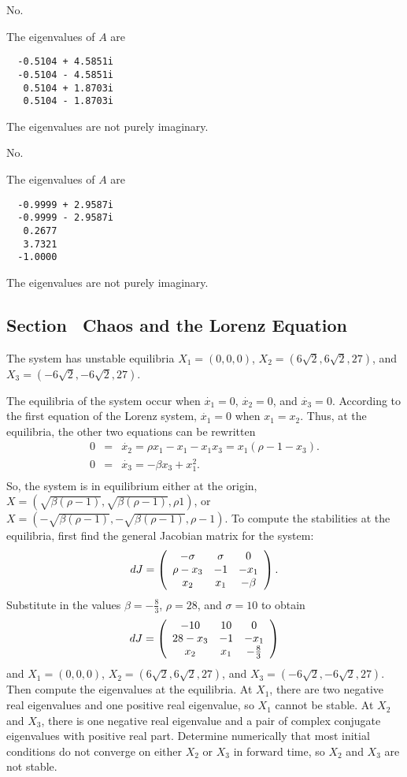  \ans No.

\soln The eigenvalues of $A$ are 
\begin{verbatim}
  -0.5104 + 4.5851i
  -0.5104 - 4.5851i
   0.5104 + 1.8703i
   0.5104 - 1.8703i
\end{verbatim}
The eigenvalues are not purely imaginary.

 \ans No.

\soln The eigenvalues of $A$ are 
\begin{verbatim}
  -0.9999 + 2.9587i
  -0.9999 - 2.9587i
   0.2677          
   3.7321          
  -1.0000          
\end{verbatim}
The eigenvalues are not purely imaginary.



\newpage
\subsection*{Section~\protect{\ref{S:chaos}} Chaos and the Lorenz Equation}

 \ans The system has unstable equilibria $X_1 = (0,0,0)$, 
$X_2 = (6\sqrt{2},6\sqrt{2},27)$, and $X_3 = (-6\sqrt{2},-6\sqrt{2},27)$.

\soln The equilibria of the system occur when $\dot{x_1} = 0$, $\dot{x_2}
= 0$, and $\dot{x_3} = 0$.  According to the first equation of the Lorenz
system, $\dot{x_1} = 0$ when $x_1 = x_2$.  Thus, at the equilibria, the
other two equations can be rewritten
\[
\begin{array}{rcl}
0 & = & \dot{x_2} = \rho x_1 - x_1 - x_1x_3 = x_1(\rho - 1 - x_3). \\
0 & = & \dot{x_3} = -\beta x_3 + x_1^2. \\
\end{array}
\]
So, the system is in equilibrium either at the origin, $X =
(\sqrt{\beta (\rho - 1)}, \sqrt{\beta (\rho - 1)}, \rho 1)$, or
$X = (-\sqrt{\beta (\rho - 1)}, -\sqrt{\beta (\rho - 1)}, \rho - 1)$.
To compute the stabilities at the equilibria, first find the general
Jacobian matrix for the system:
\[
dJ = \left(\begin{array}{ccc} -\sigma & \sigma & 0 \\ \rho - x_3 & -1 & -x_1 \\ x_2 & x_1 & -\beta\end{array}\right).
\]
Substitute in the values $\beta = -\frac{8}{3}$, $\rho = 28$, and $\sigma
= 10$ to obtain
\[
dJ = \left(\begin{array}{ccc} -10 & 10 & 0 \\ 28 - x_3 & -1 & -x_1 \\ x_2 & x_1 & -\frac{8}{3}\end{array}\right)
\]
and $X_1 = (0,0,0)$, $X_2 = (6\sqrt{2},6\sqrt{2},27)$, and
$X_3 = (-6\sqrt{2},-6\sqrt{2},27)$.  Then compute the eigenvalues at the
equilibria.  At $X_1$, there are two negative real eigenvalues and one 
positive real eigenvalue, so $X_1$ cannot be stable.  At $X_2$ and $X_3$,
there is one negative real eigenvalue and a pair of complex conjugate
eigenvalues with positive real part.  Determine numerically that most
initial conditions do not converge on either $X_2$ or $X_3$ in forward time,
so $X_2$ and $X_3$ are not stable.

